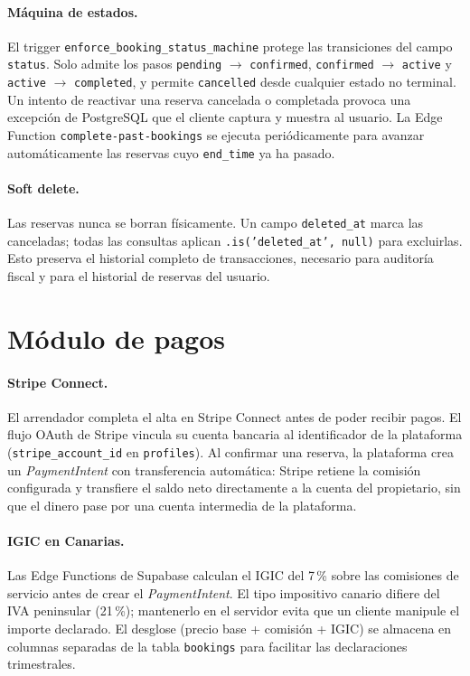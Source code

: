 \paragraph{Máquina de estados.}
El trigger \texttt{enforce\_booking\_status\_machine} protege las transiciones del campo \texttt{status}. Solo admite los pasos \texttt{pending} $\to$ \texttt{confirmed}, \texttt{confirmed} $\to$ \texttt{active} y \texttt{active} $\to$ \texttt{completed}, y permite \texttt{cancelled} desde cualquier estado no terminal. Un intento de reactivar una reserva cancelada o completada provoca una excepción de PostgreSQL que el cliente captura y muestra al usuario. La Edge Function \texttt{complete-past-bookings} se ejecuta periódicamente para avanzar automáticamente las reservas cuyo \texttt{end\_time} ya ha pasado.

\paragraph{Soft delete.}
Las reservas nunca se borran físicamente. Un campo \texttt{deleted\_at} marca las canceladas; todas las consultas aplican \texttt{.is('deleted\_at', null)} para excluirlas. Esto preserva el historial completo de transacciones, necesario para auditoría fiscal y para el historial de reservas del usuario.

\section{Módulo de pagos}
\label{sec:impl_pagos}

\paragraph{Stripe Connect.}
El arrendador completa el alta en Stripe Connect antes de poder recibir pagos. El flujo OAuth de Stripe vincula su cuenta bancaria al identificador de la plataforma (\texttt{stripe\_account\_id} en \texttt{profiles}). Al confirmar una reserva, la plataforma crea un \textit{PaymentIntent} con transferencia automática: Stripe retiene la comisión configurada y transfiere el saldo neto directamente a la cuenta del propietario, sin que el dinero pase por una cuenta intermedia de la plataforma.

\paragraph{IGIC en Canarias.}
Las Edge Functions de Supabase calculan el IGIC del 7\,\% sobre las comisiones de servicio antes de crear el \textit{PaymentIntent}. El tipo impositivo canario difiere del IVA peninsular (21\,\%); mantenerlo en el servidor evita que un cliente manipule el importe declarado. El desglose (precio base + comisión + IGIC) se almacena en columnas separadas de la tabla \texttt{bookings} para facilitar las declaraciones trimestrales.

